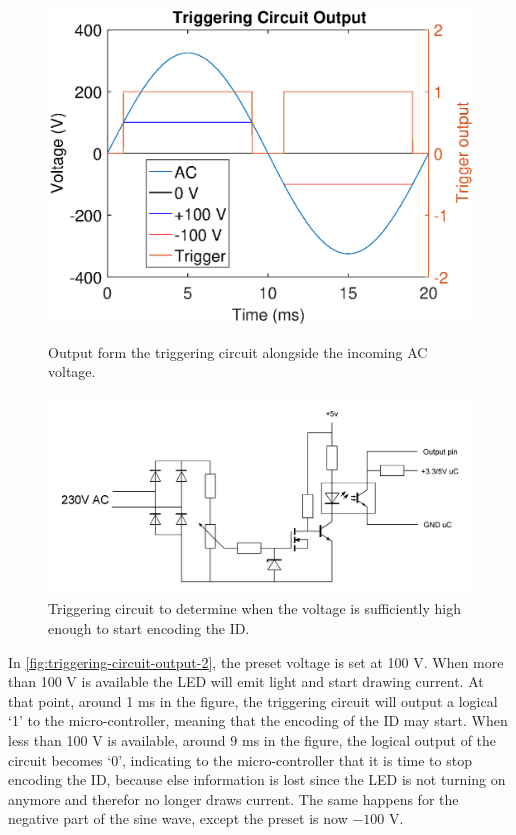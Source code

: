 	\begin{figure}[h]
		\centering
		\begin{minipage}[b]{0.49\textwidth}
			\includegraphics[width=\textwidth]{chapters/hardware-chapters/AC/ac-modulator/custom-hardware/ac-trigger/ac-wave-triggering.eps}
			\caption{Output form the triggering circuit alongside the incoming AC voltage.}
			\label{fig:triggering-circuit-output-2}
		\end{minipage}
		\hfill
		\begin{minipage}[b]{0.49\textwidth}
			\includegraphics[width=\textwidth]{chapters/hardware-chapters/AC/ac-modulator/custom-hardware/ac-trigger/custom-modulator-trigger.JPG}
		    \caption{Triggering circuit to determine when the voltage is sufficiently high enough to start encoding the ID.}
			\label{fig:custom-modulator-trigger}
		\end{minipage}
	\end{figure}

	In \autoref{fig:triggering-circuit-output-2}, the preset voltage is set at 100 V.
	When more than 100 V is available the LED will emit light and start drawing current.
	At that point, around 1 ms in the figure, the triggering circuit will output a logical `1' to the micro-controller, meaning that the encoding of the ID may start.
	When less than 100 V is available, around 9 ms in the figure, the logical output of the circuit becomes `0', indicating to the micro-controller that it is time to stop encoding the ID, because else information is lost since the LED is not turning on anymore and therefor no longer draws current.
	The same happens for the negative part of the sine wave, except the preset is now $-100$ V.


